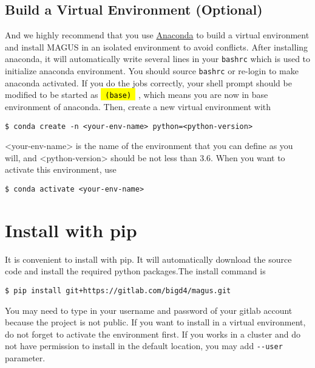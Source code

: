 \documentclass[12pt,oneside]{book}
\newcommand{\code}[1]{
  \begingroup
  \sethlcolor{Seashell}
  {\hl{\texttt{~#1~}}}
  \endgroup
}
\newcommand{\file}[1]{\texttt{#1}}
\newcommand{\chref}[3][blue]{\textcolor{#1}{\href{#2}{#3}}} %
\begin{document}
\subsection{Build a Virtual Environment (Optional)}
And we highly recommend that you use \chref{https://www.anaconda.com}{Anaconda} to build a virtual environment and install MAGUS in an isolated environment to avoid conflicts. After installing anaconda, it will automatically write several lines in your \file{bashrc} which is used to initialize anaconda environment. You should source \file{bashrc} or re-login to make anaconda activated.
If you do the jobs correctly, your shell prompt should be modified to be started as \code{(base)}, which means you are now in base environment of anaconda. Then, create a new virtual environment with
\begin{tcolorbox}
\begin{verbatim}
$ conda create -n <your-env-name> python=<python-version>
\end{verbatim}
\end{tcolorbox}
<your-env-name> is the name of the environment that you can define as you will, and <python-version> should be not less than 3.6. When you want to activate this environment, use
\begin{tcolorbox}
\begin{verbatim}
$ conda activate <your-env-name>
\end{verbatim}
\end{tcolorbox}

\section{Install with pip}
It is convenient to install with pip. It will automatically download the source code and install the required python packages.The install command is
\begin{tcolorbox}
    \begin{verbatim}
$ pip install git+https://gitlab.com/bigd4/magus.git
    \end{verbatim}
\end{tcolorbox}
You may need to type in your username and password of your gitlab account because the project is not public. If you want to install in a virtual environment, do not forget to activate the environment first. If you works in a cluster and do not have permission to install in the default location, you may add \verb|--user| parameter.
\end{document}
